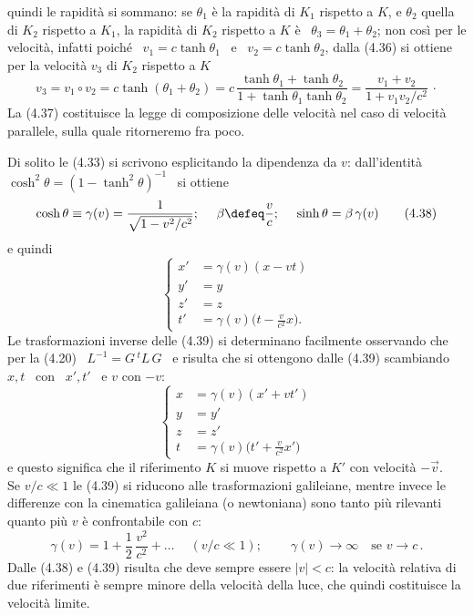 quindi le rapidit\`a si sommano: se $\theta_1$ \`e la rapidit\`a di $K_1$
rispetto a $K$, e $\theta_2$ quella di $K_2$ rispetto a $K_1$, la rapidit\`a di
$K_2$ rispetto a $K$ \`e \ $\theta_3=\theta_1+\theta_2$; non cos\`i per le
velocit\`a, infatti poich\'e \ $v_1=c\tanh\theta_1$ \ e \ $v_2=c\tanh\theta_2$,
dalla (4.36) si ottiene per la velocit\`a $v_3$ di $K_2$ rispetto a $K$
\begin{equation}
  v_3=v_1\circ v_2=c\tanh(\theta_1+\theta_2)
  =c\,\frac{\tanh\theta_1+\tanh\theta_2}{1+\tanh\theta_1\tanh\theta_2}
  =\frac{v_1+v_2}{1+v_1v_2/c^2}\,\cdot
  \tag{4.37}
\end{equation}
La (4.37) costituisce la legge di composizione delle velocit\`a nel caso di
velocit\`a parallele, sulla quale ritorneremo fra poco.

Di solito le (4.33) si scrivono esplicitando la dipendenza da $v$:
dall'identit\`a \ $\cosh^2\theta=(1-\tanh^2\theta)^{-1}$ \ si ottiene
\begin{equation}
  \cosh\theta\equiv\gamma(v)=\frac{1}{\sqrt{1-v^2/c^2}};
  \quad\ \beta\defeq\frac vc;\quad\ \sinh\theta=\beta\,\gamma(v)
  \tag{4.38}
\end{equation}
e quindi
\begin{equation}
  \left\{\begin{aligned}
    x'&=\gamma(v)(x-vt)\\
    y'&=y\\
    z'&=z\\
    t'&=\gamma(v)\Big(t-\frac{v}{c^2}x\Big).
  \end{aligned}\right.
  \tag{4.39}
\end{equation}
Le trasformazioni inverse delle (4.39) si determinano facilmente osservando che
per la (4.20) \ $L^{-1}=G\,{}^tL\,G$ \ e risulta che si ottengono dalle (4.39)
scambiando \ $x,t$ \ con \ $x',t'$ \ e $v$ con $-v$:
\begin{equation}
  \left\{\begin{aligned}
    x&=\gamma(v)(x'+vt')\\
    y&=y'\\
    z&=z'\\
    t&=\gamma(v)\Big(t'+\frac{v}{c^2}x'\Big)
  \end{aligned}\right.
  \tag{4.40}
\end{equation}
e questo significa che il riferimento $K$ si muove rispetto a $K'$ con
velocit\`a $-\vec v$.\\
Se $v/c\ll1$ le (4.39) si riducono alle trasformazioni galileiane, mentre invece
le differenze con la cinematica galileiana (o newtoniana) sono tanto pi\`u
rilevanti quanto pi\`u $v$ \`e confrontabile con $c$:
\begin{equation}
  \gamma(v)=1+\frac12\,\frac{v^2}{c^2}+\dots
  \quad\ (v/c\ll1);\qquad\ \gamma(v)\to\infty\quad\text{se }v\to c\,.
  \tag{4.41}
\end{equation}
Dalle (4.38) e (4.39) risulta che deve sempre essere $|v|<c$: la velocit\`a
relativa di due riferimenti \`e sempre minore della velocit\`a della luce, che
quindi costituisce la velocit\`a limite.

